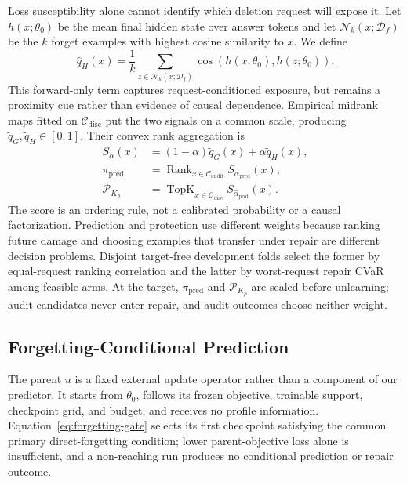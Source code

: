 Loss susceptibility alone cannot identify which deletion request will expose
it. Let $h(x;\theta_0)$ be the mean final hidden state over answer tokens and
let $\mathcal N_k(x;\mathcal D_f)$ be the $k$ forget examples with highest
cosine similarity to $x$. We define
\begin{equation}
  \widehat q_H(x)
  =
  \frac{1}{k}\sum_{z\in\mathcal N_k(x;\mathcal D_f)}
  \operatorname{cos}\!\left(h(x;\theta_0),h(z;\theta_0)\right).
  \label{eq:hidden-proximity}
\end{equation}
This forward-only term captures request-conditioned exposure, but remains a
proximity cue rather than evidence of causal dependence. Empirical midrank
maps fitted on $\mathcal C_{\mathrm{disc}}$ put the two signals on a common
scale, producing $\widetilde q_G,\widetilde q_H\in[0,1]$. Their convex rank
aggregation is
\begin{equation}
\begin{aligned}
  S_\alpha(x)
  &=(1-\alpha)\widetilde q_G(x)+\alpha\widetilde q_H(x),\\
  \pi_{\mathrm{pred}}
  &=\operatorname{Rank}_{x\in\mathcal C_{\mathrm{audit}}}
    S_{\widehat\alpha_{\mathrm{pred}}}(x),\\
  \mathcal P_{K_p}
  &=\operatorname{TopK}_{x\in\mathcal C_{\mathrm{disc}}}
    S_{\widehat\alpha_{\mathrm{prot}}}(x).
\end{aligned}
\label{eq:mixture}
\end{equation}
The score is an ordering rule, not a calibrated probability or a causal
factorization. Prediction and protection use different weights because
ranking future damage and choosing examples that transfer under repair are
different decision problems. Disjoint target-free development folds select
the former by equal-request ranking correlation and the latter by
worst-request repair CVaR among feasible arms. At the target,
$\pi_{\mathrm{pred}}$ and $\mathcal P_{K_p}$ are sealed before unlearning;
audit candidates never enter repair, and audit outcomes choose neither
weight.

\subsection{Forgetting-Conditional Prediction}

The parent $u$ is a fixed external update operator rather than a component of
our predictor. It starts from $\theta_0$, follows its frozen objective,
trainable support, checkpoint grid, and budget, and receives no profile
information. Equation~\eqref{eq:forgetting-gate} selects its first checkpoint
satisfying the common primary direct-forgetting condition; lower
parent-objective loss alone is insufficient, and a non-reaching run produces
no conditional prediction or repair outcome.

